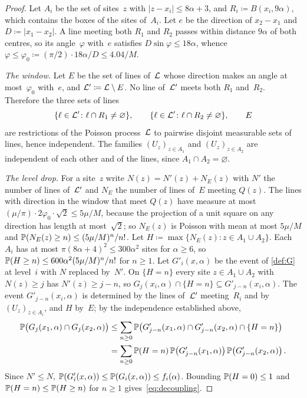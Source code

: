 \documentclass[11pt,letterpaper]{article}
\newcommand{\Lp}{\cL'}
\begin{document}
\begin{proof}
Let $A_i$ be the set of sites~$z$ with $\lvert z-x_i\rvert\le8\alpha+3$, and $R_i\coloneqq B(x_i,9\alpha)$, which contains the boxes of the sites of~$A_i$. Let $e$ be the direction of $x_2-x_1$ and $D\coloneqq\lvert x_1-x_2\rvert$. A line meeting both $R_1$ and $R_2$ passes within distance $9\alpha$ of both centres, so its angle~$\varphi$ with~$e$ satisfies $D\sin\varphi\le18\alpha$, whence $\varphi\le\varphi_0\coloneqq(\pi/2)\cdot18\alpha/D\le4.04/M$.

\emph{The window.} Let $E$ be the set of lines of~$\cL$ whose direction makes an angle at most~$\varphi_0$ with~$e$, and $\Lp\coloneqq\cL\setminus E$. No line of~$\Lp$ meets both $R_1$ and~$R_2$. Therefore the three sets of lines
\begin{equation*}
  \{\ell\in\Lp\colon\ell\cap R_1\neq\varnothing\},\qquad\{\ell\in\Lp\colon\ell\cap R_2\neq\varnothing\},\qquad E
\end{equation*}
are restrictions of the Poisson process~$\cL$ to pairwise disjoint measurable sets of lines, hence independent. The families $(U_z)_{z\in A_1}$ and $(U_z)_{z\in A_2}$ are independent of each other and of the lines, since $A_1\cap A_2=\varnothing$.

\emph{The level drop.} For a site~$z$ write $N(z)=N'(z)+N_E(z)$ with $N'$ the number of lines of~$\Lp$ and $N_E$ the number of lines of~$E$ meeting $Q(z)$. The lines with direction in the window that meet $Q(z)$ have measure at most $(\mu/\pi)\cdot2\varphi_0\cdot\sqrt2\le5\mu/M$, because the projection of a unit square on any direction has length at most~$\sqrt2$; so $N_E(z)$ is Poisson with mean at most $5\mu/M$ and $\P(N_E(z)\ge n)\le(5\mu/M)^n/n!$. Let $H\coloneqq\max\{N_E(z)\colon z\in A_1\cup A_2\}$. Each $A_i$ has at most $\pi(8\alpha+4)^2\le300\alpha^2$ sites for $\alpha\ge6$, so $\P(H\ge n)\le600\alpha^2(5\mu/M)^n/n!$ for $n\ge1$. Let $G'_{i}(x,\alpha)$ be the event of \cref{def:G} at level~$i$ with $N$ replaced by~$N'$. On $\{H=n\}$ every site $z\in A_1\cup A_2$ with $N(z)\ge j$ has $N'(z)\ge j-n$, so $G_j(x_i,\alpha)\cap\{H=n\}\subseteq G'_{j-n}(x_i,\alpha)$. The event $G'_{j-n}(x_i,\alpha)$ is determined by the lines of~$\Lp$ meeting~$R_i$ and by $(U_z)_{z\in A_i}$, and $H$ by~$E$; by the independence established above,
\begin{align*}
  \P\bigl(G_j(x_1,\alpha)\cap G_j(x_2,\alpha)\bigr)
  &\le\sum_{n\ge0}\P\bigl(G'_{j-n}(x_1,\alpha)\cap G'_{j-n}(x_2,\alpha)\cap\{H=n\}\bigr)\\
  &=\sum_{n\ge0}\P(H=n)\,\P\bigl(G'_{j-n}(x_1,\alpha)\bigr)\,\P\bigl(G'_{j-n}(x_2,\alpha)\bigr)\,.
\end{align*}
Since $N'\le N$, $\P(G'_{i}(x,\alpha))\le\P(G_i(x,\alpha))\le f_i(\alpha)$. Bounding $\P(H=0)\le1$ and $\P(H=n)\le\P(H\ge n)$ for $n\ge1$ gives~\eqref{eq:decoupling}.
\end{proof}
\end{document}
